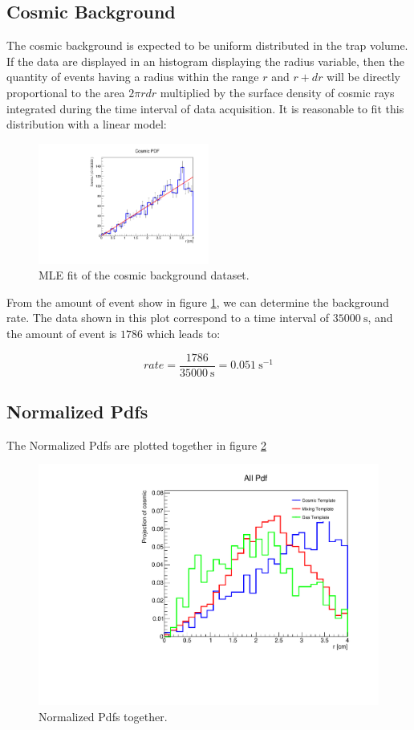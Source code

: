 \documentclass[11pt,a4paper,twocolumn]{article}
\begin{document}
\subsection*{Cosmic Background}

The cosmic background is expected to be uniform distributed in the trap volume. If the data are displayed in an histogram displaying the radius variable, then the quantity of events having a radius within the range $r$ and $r + dr$ will be directly proportional to the area $ 2 \pi r dr$ multiplied by the surface density of cosmic rays integrated during the time interval of data acquisition. It is reasonable to fit this distribution with a linear model:

\begin{figure}[hbtp]

\centering
\includegraphics[width = 0.5\textwidth]{../PlotMLEfit/SingleModel/Cosmici_fit.pdf}
\caption{ MLE fit of the cosmic background dataset.}
\label{fig:CosmicBackground}
\end{figure}

From the amount of event show in figure \ref{fig:CosmicBackground}, we can determine the background rate. The data shown in this plot correspond to a time interval of $\SI{35000}{\second}$, and the amount of event is $1786$ which leads to:

\begin{equation} \label{eq:Rate}
rate = \frac{1786}{\SI{35000}{\second}} = \SI{0.051}{\second \tothe{-1}}
\end{equation}

\subsection{Normalized Pdfs}

The Normalized Pdfs are plotted together in figure \ref{fig:PdfsNormalized}
\begin{figure}[!hbtp]
\centering
\includegraphics[width = .5\textwidth]{../PlotMLEfit/PdfTogether.pdf}
\caption{Normalized Pdfs together.}
\label{fig:PdfsNormalized}
\end{figure}
\end{document}

